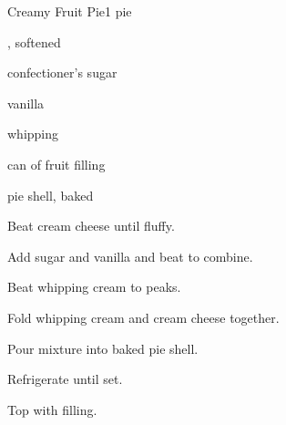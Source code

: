 \begin{recipe}{Creamy Fruit Pie}{}{1 pie}

\begin{ingredients}
\item {} , softened
\item {} confectioner's sugar
\item {} vanilla
\item {} whipping 
\item can of fruit filling
\item pie shell, baked
\end{ingredients}

\begin{directions}
\item Beat cream cheese until fluffy.
\item Add sugar and vanilla and beat to combine.
\item Beat whipping cream to peaks.
\item Fold whipping cream and cream cheese together.
\item Pour mixture into baked pie shell.
\item Refrigerate until set.
\item Top with filling.
\end{directions}

\end{recipe}
